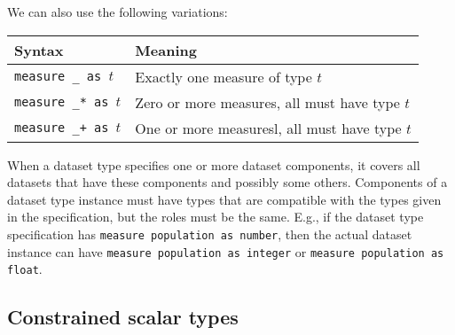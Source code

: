 \documentclass[droidmono,libertine,twoside,user,unofficial]{ecarticle}
\begin{document}
%
We can also use the following variations:
\begin{center}
  \begin{tabular}{l|l}
    \textbf{Syntax}
    & \textbf{Meaning}
    \\\hline
    \texttt{measure \_ as $t$}
    &
      Exactly one measure of type $t$
    \\
    \texttt{measure \_* as $t$}
    &
      Zero or more measures, all must have type $t$
    \\
    \texttt{measure \_+ as $t$}
    &
      One or more  measuresl, all must have type $t$
    \\\hline
  \end{tabular}
\end{center}

When a dataset type specifies one or more dataset components, it
covers all datasets that have these components and possibly some
others.  Components of a dataset type instance must have types that
are compatible with the types given in the specification, but the
roles must be the same.  E.g., if the dataset type specification has
\texttt{measure population as number}, then the actual dataset
instance can have \texttt{measure population as integer} or
\texttt{measure population as float}.


\subsection{Constrained scalar types}
\label{sec:constrained-scalar-types}
\end{document}
